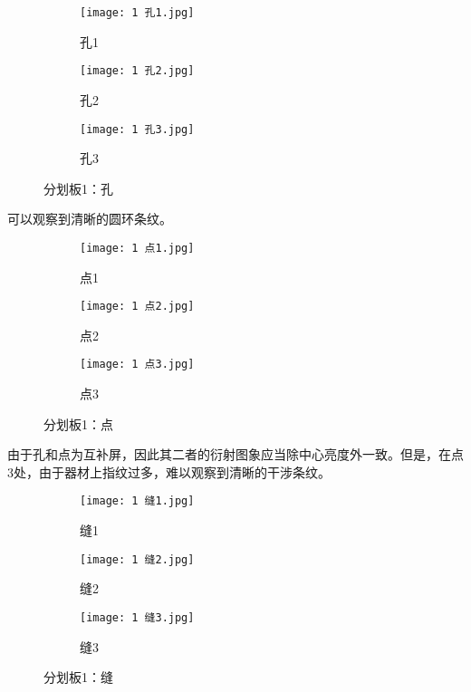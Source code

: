 \documentclass[11pt]{article}
\begin{document}
	\begin{figure}[H]
		\centering
		\begin{subfigure}{0.32\textwidth}
			\texttt{[image: 1 孔1.jpg]}
			\caption{孔1}
		\end{subfigure}
		\begin{subfigure}{0.32\textwidth}
			\texttt{[image: 1 孔2.jpg]}
			\caption{孔2}
		\end{subfigure}
		\begin{subfigure}{0.32\textwidth}
			\texttt{[image: 1 孔3.jpg]}
			\caption{孔3}
		\end{subfigure}
		\caption{分划板1：孔}
		\label{fig:1孔}
	\end{figure}
	可以观察到清晰的圆环条纹。
	
	\begin{figure}[H]
		\centering
		\begin{subfigure}{0.32\textwidth}
			\texttt{[image: 1 点1.jpg]}
			\caption{点1}
		\end{subfigure}
		\begin{subfigure}{0.32\textwidth}
			\texttt{[image: 1 点2.jpg]}
			\caption{点2}
		\end{subfigure}
		\begin{subfigure}{0.32\textwidth}
			\texttt{[image: 1 点3.jpg]}
			\caption{点3}
		\end{subfigure}
		\caption{分划板1：点}
		\label{fig:1点}
	\end{figure}
	由于孔和点为互补屏，因此其二者的衍射图象应当除中心亮度外一致。但是，在点3处，由于器材上指纹过多，难以观察到清晰的干涉条纹。
	
	\begin{figure}[H]
		\centering
		\begin{subfigure}{0.32\textwidth}
			\texttt{[image: 1 缝1.jpg]}
			\caption{缝1}
		\end{subfigure}
		\begin{subfigure}{0.32\textwidth}
			\texttt{[image: 1 缝2.jpg]}
			\caption{缝2}
		\end{subfigure}
		\begin{subfigure}{0.32\textwidth}
			\texttt{[image: 1 缝3.jpg]}
			\caption{缝3}
		\end{subfigure}
		\caption{分划板1：缝}
		\label{fig:1缝}
	\end{figure}
	
\end{document}
